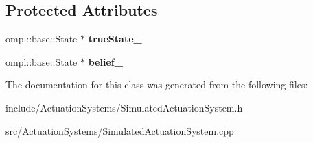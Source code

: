 \subsection*{\-Protected \-Attributes}
\begin{DoxyCompactItemize}
\item 
\hypertarget{class_simulated_actuation_system_a6d2af7c89177a93d2e49a8561c538a1f}{ompl\-::base\-::\-State $\ast$ {\bfseries true\-State\-\_\-}}\label{class_simulated_actuation_system_a6d2af7c89177a93d2e49a8561c538a1f}

\item 
\hypertarget{class_simulated_actuation_system_a28301763f343a04381caae1461a46f7a}{ompl\-::base\-::\-State $\ast$ {\bfseries belief\-\_\-}}\label{class_simulated_actuation_system_a28301763f343a04381caae1461a46f7a}

\end{DoxyCompactItemize}


\-The documentation for this class was generated from the following files\-:\begin{DoxyCompactItemize}
\item 
include/\-Actuation\-Systems/\-Simulated\-Actuation\-System.\-h\item 
src/\-Actuation\-Systems/\-Simulated\-Actuation\-System.\-cpp\end{DoxyCompactItemize}
